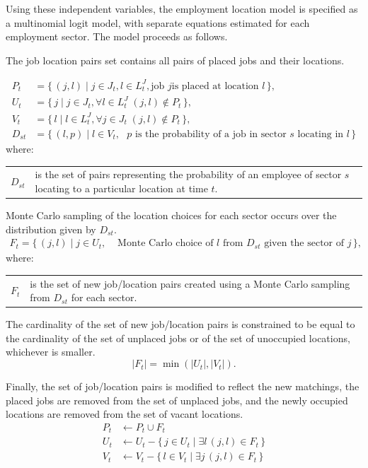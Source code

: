 \documentclass[fleqn]{article}
\newcommand{\JL}{L^J}
\begin{document}
Using these independent variables, the employment location model
is specified as a multinomial logit model, with separate equations
estimated for each employment sector. The model proceeds as
follows.

The job location pairs set contains all pairs of placed jobs
and their locations.

\begin{align}
P_t &= \{\, (j, l) \mid j \in J_{t}, l \in \JL_{t}, \text{job $j$
  is placed at location $l$} \,\},\\
U_t &= \{\, j \mid j \in J_{t}, \forall l \in \JL_{t} \;
     (j, l) \notin P_t \,\},\\
V_t &= \{\, l \mid l \in \JL_{t}, \forall j \in J_{t} \;
     (j, l) \notin P_t \,\},\\
D_{st} &= \{\, (l, p) \mid l \in V_t, \text{ $p$ is the
   probability of a job in sector $s$ locating in $l$} \,\}
\end{align}
where:
\begin{center}
\begin{tabular}{c p{5.5in}}
$D_{st}$ & is the set of pairs representing the probability of an
employee of sector $s$ locating to a particular location at time $t$.\\
\end{tabular}
\end{center}

Monte Carlo sampling of the location choices for each sector
occurs over the distribution given by $D_{st}$.
\begin{align}
F_t = \{\, (j, l) \mid j \in U_t, &\text{ Monte Carlo
choice of $l$ from $D_{st}$ given the sector of $j$} \,\},
\end{align}
where:
\begin{center}
\begin{tabular}{c p{5.5in}}
$F_t$ & is the set of new job/location pairs created using a
Monte Carlo sampling from $D_{st}$ for each sector.\\
\end{tabular}
\end{center}

The cardinality of the set of new job/location pairs is constrained to be
equal to the cardinality of the set of unplaced jobs or of the set of
unoccupied locations, whichever is smaller.
\begin{equation}
|F_t| = \min( |U_t|, |V_t| ).
\end{equation}

Finally, the set of job/location pairs is modified to reflect the
new matchings, the placed jobs are removed from the set of
unplaced jobs, and the newly occupied locations are removed from
the set of vacant locations.
\begin{align}
P_t & \leftarrow P_t \cup F_t \\
U_t & \leftarrow U_t - \{\, j \in U_{t} \mid \exists l \, (j,l) \in F_t \,\} \\
V_t & \leftarrow V_t - \{\, l \in V_{t} \mid \exists j \, (j,l) \in F_t \,\}
\end{align}
\end{document}
